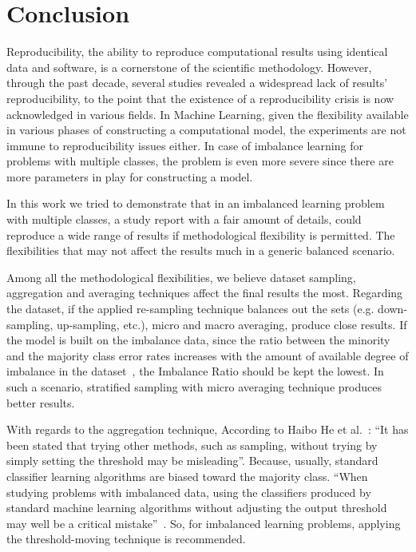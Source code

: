 \section{Conclusion}

Reproducibility, the ability to reproduce computational results using identical data and software, 
is a cornerstone of the scientific methodology. However, through the past decade, several studies 
revealed a widespread lack of results’ reproducibility, to the point that the existence of a 
reproducibility crisis is now acknowledged in various fields.
In Machine Learning, given the flexibility available in various phases of constructing a 
computational model, the experiments are not immune to reproducibility issues either. 
In case of imbalance learning for problems with multiple classes, the problem is even more 
severe since there are more parameters in play for constructing a model.

In this work we tried to demonstrate that in an imbalanced learning problem with multiple classes,
a study report with a fair amount of details, could reproduce a wide range of results if 
methodological flexibility is permitted. The flexibilities that may not affect the results 
much in a generic balanced scenario. 

Among all the methodological flexibilities, we believe dataset sampling, aggregation and 
averaging techniques affect the final results the most. Regarding the dataset, if the applied 
re-sampling technique balances out the sets (e.g. down-sampling, up-sampling, etc.), micro and 
macro averaging, produce close results. If the model is built on the imbalance data, since the 
ratio between the minority and the majority class error rates increases with the amount of 
available degree of imbalance in the dataset~\cite{japkowicz_concept-learning_2001}, the 
Imbalance Ratio should be kept the lowest. In such a scenario, stratified sampling with micro 
averaging technique produces better results. 

With regards to the aggregation technique, According to Haibo He et al.~\cite{haibo_he_learning_2009}: 
“It has been stated that trying other methods, such as sampling, without trying by simply setting the 
threshold may be misleading”. Because, usually, standard classifier learning algorithms are 
biased toward the majority class. “When studying problems with imbalanced data, using the 
classifiers produced by standard machine learning algorithms without adjusting the output 
threshold may well be a critical mistake”~\cite{provost_machine_2000}. So, for imbalanced 
learning problems, applying the threshold-moving technique is recommended. 

